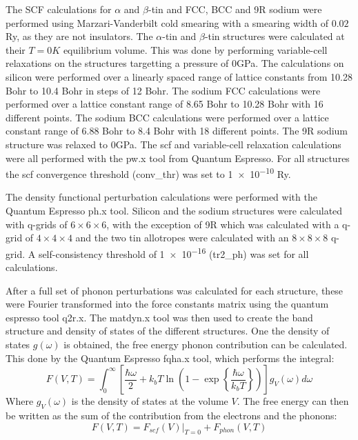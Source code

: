 \documentclass[12pt]{article}
\begin{document}
The SCF calculations for $\alpha$ and $\beta$-tin and FCC, BCC and 9R sodium were performed using Marzari-Vanderbilt cold smearing \cite{marzari1999thermal} with a smearing width of $0.02$ Ry, as they are not insulators. 
The $\alpha$-tin and $\beta$-tin structures were calculated at their $T=0K$ equilibrium volume. This was done by performing variable-cell relaxations on the structures targetting a pressure of $0$GPa. The calculations on silicon were performed over a linearly spaced range of lattice constants from 10.28 Bohr to 10.4 Bohr in steps of 12 Bohr. The sodium FCC calculations were performed over a lattice constant range of 8.65 Bohr to 10.28 Bohr with 16 different points. The sodium BCC calculations were performed over a lattice constant range of 6.88 Bohr to 8.4 Bohr with 18 different points. The 9R sodium structure was relaxed to 0GPa. The scf and variable-cell relaxation calculations were all performed with the pw.x tool from Quantum Espresso. For all structures the scf convergence threshold (conv\_thr) was set to \num{1e-10} Ry.

The density functional perturbation calculations were performed with the Quantum Espresso ph.x tool. Silicon and the sodium structures were calculated with q-grids of $6\times 6\times 6$, with the exception of 9R which was calculated with a q-grid of $4\times4\times4$ and the two tin allotropes were calculated with an $8\times8\times8$ q-grid. A self-consistency threshold of \num{1e-16} (tr2\_ph) was set for all calculations.

After a full set of phonon perturbations was calculated for each structure, these were Fourier transformed into the force constants matrix using the quantum espresso tool q2r.x. The matdyn.x tool was then used to create the band structure and density of states of the different structures. One the density of states $g(\omega)$ is obtained, the free energy phonon contribution can be calculated. This done by the Quantum Espresso fqha.x tool, which performs the integral:
\begin{equation}
	\label{eq:phononfreeenergy}
	F(V, T) = \int_0^\infty \left[\frac{\hbar\omega}{2} + k_bT \ln\left(1-\exp\left\{\frac{\hbar \omega}{k_bT}\right\} \right) \right]g_V(\omega) d\omega
\end{equation}
Where $g_V(\omega)$ is the density of states at the volume $V$. The free energy can then be written as the sum of the contribution from the electrons and the phonons: 
\begin{equation}\label{eq:total_free_energy}
F(V, T) = F_{scf}(V)|_{T=0} + F_{phon}(V, T)
\end{equation}
\end{document}
